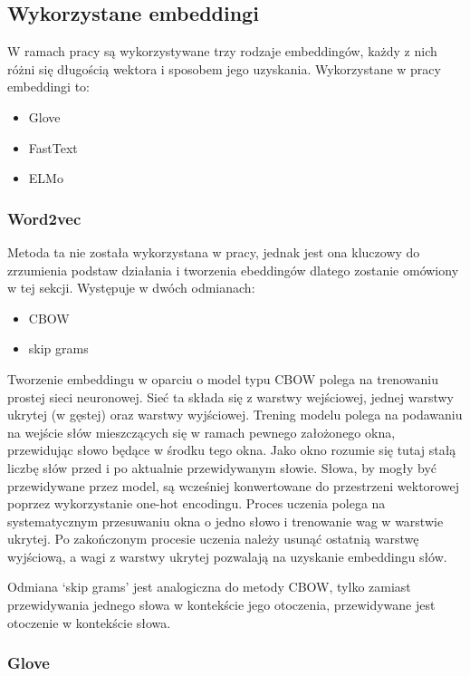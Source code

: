 \subsection{Wykorzystane embeddingi}
W ramach pracy są wykorzystywane trzy rodzaje embeddingów, każdy z nich różni się długością wektora i sposobem jego uzyskania. Wykorzystane w pracy embeddingi to:
\begin{itemize}
    \item Glove
    \item FastText
    \item ELMo
\end{itemize}



\subsubsection{Word2vec}
Metoda ta nie została wykorzystana w pracy, jednak jest ona kluczowy do zrzumienia podstaw działania i tworzenia ebeddingów dlatego zostanie omówiony w tej sekcji. Występuje w dwóch odmianach: 

\begin{itemize}
    \item CBOW
    \item skip grams 
\end{itemize}



Tworzenie embeddingu w oparciu o model typu CBOW polega na trenowaniu prostej sieci neuronowej. Sieć ta składa się z warstwy wejściowej, jednej warstwy ukrytej (w gęstej) oraz warstwy wyjściowej. Trening modelu polega na podawaniu na wejście słów mieszczących się w ramach pewnego założonego okna, przewidując słowo będące w środku tego okna. Jako okno rozumie się tutaj stałą liczbę słów przed i po aktualnie przewidywanym słowie. Słowa, by mogły być przewidywane przez model, są wcześniej konwertowane do przestrzeni wektorowej poprzez wykorzystanie one-hot encodingu. Proces uczenia polega na systematycznym przesuwaniu okna o jedno słowo i trenowanie wag w warstwie ukrytej. Po zakończonym procesie uczenia należy usunąć ostatnią warstwę wyjściową, a wagi z warstwy ukrytej pozwalają na uzyskanie embeddingu słów.  

Odmiana ‘skip grams’ jest analogiczna do metody CBOW, tylko zamiast przewidywania jednego słowa w kontekście jego otoczenia, przewidywane jest otoczenie w kontekście słowa. 


\subsubsection{Glove}

